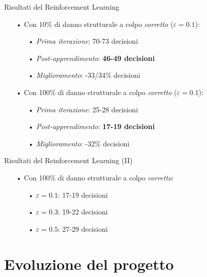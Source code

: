 \documentclass{beamer}
\begin{document}
    \begin{frame}{Risultati del Reinforcement Learning}
        \large
        \begin{itemize}
            \item[•] Con 10\% di danno strutturale a colpo \textit{corretto} ($\varepsilon = 0.1$):
                \begin{itemize}
                    \item[•] \textit{Prima iterazione}: 70-73 decisioni
                    \item[•] \textit{Post-apprendimento}: \textbf{46-49 decisioni}
                    \item[•] \textit{Miglioramento}: -33/34\% decisioni
                \end{itemize}
            \item[•] Con 100\% di danno strutturale a colpo \textit{corretto} ($\varepsilon = 0.1$):
                \begin{itemize}
                    \item[•] \textit{Prima iterazione}: 25-28 decisioni
                    \item[•] \textit{Post-apprendimento}: \textbf{17-19 decisioni}
                    \item[•] \textit{Miglioramento}: -32\% decisioni
                \end{itemize}
        \end{itemize}
    \end{frame}

    \begin{frame}{Risultati del Reinforcement Learning (II)}
        \begin{itemize}
            \Large
            \item[•] Con 100\% di danno strutturale a colpo \textit{corretto}:
                \begin{itemize}
                    \item[•] $\varepsilon = 0.1$: 17-19 decisioni
                    \item[•] $\varepsilon = 0.3$: 19-22 decisioni
                    \item[•] $\varepsilon = 0.5$: 27-29 decisioni
                \end{itemize}
        \end{itemize}
    \end{frame}


    \section{Evoluzione del progetto}
\end{document}
